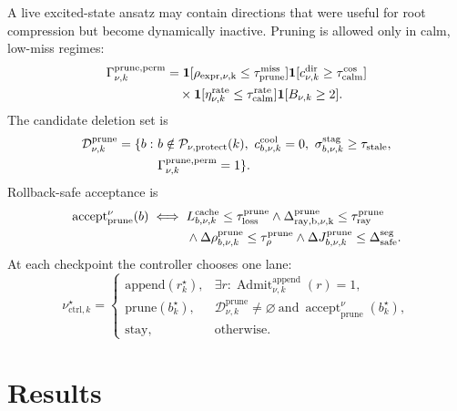 \documentclass[
  reprint,
  amsmath,
  amssymb,
  aps,
  pra,
  nofootinbib,
  superscriptaddress,
  floatfix
]{revtex4-2}
\newcommand{\Dcal}{\mathcal{D}}
\newcommand{\Pcal}{\mathcal{P}}
\newcommand{\ctrl}{\mathrm{ctrl}}
\newcommand{\stay}{\mathrm{stay}}
\newcommand{\app}{\mathrm{append}}
\newcommand{\prune}{\mathrm{prune}}
\begin{document}
A live excited-state ansatz may contain directions that were useful for root compression but become dynamically inactive.  Pruning is allowed only in calm, low-miss regimes:
\begin{equation}
\begin{aligned}
\Gamma_{\nu,k}^{\prune,\rm perm}
&=
\mathbf 1[\rho_{\rm expr,\nu,k}\le\tau_{\prune}^{\rm miss}]
\mathbf 1[c_{\nu,k}^{\rm dir}\ge\tau_{\rm calm}^{\cos}]
\nonumber\\
&\quad\times
\mathbf 1[\eta_{\nu,k}^{\rm rate}\le\tau_{\rm calm}^{\rm rate}]
\mathbf 1[B_{\nu,k}\ge2].
\end{aligned}
\label{eq:excited_prune_perm}
\end{equation}
The candidate deletion set is
\begin{equation}
\begin{aligned}
\Dcal_{\nu,k}^{\prune}
=\{b:\ &b\notin\Pcal_{\nu,\rm protect}(k),\
c_{b,\nu,k}^{\rm cool}=0,\
\sigma_{b,\nu,k}^{\rm stag}\ge\tau_{\rm stale},\\
&\Gamma_{\nu,k}^{\prune,\rm perm}=1\}.
\end{aligned}
\label{eq:excited_prune_candidates}
\end{equation}
Rollback-safe acceptance is
\begin{equation}
\begin{aligned}
\operatorname{accept}_{\prune}^{\nu}(b)\iff{}&
L_{b,\nu,k}^{\rm cache}\le\tau_{\rm loss}^{\prune}
\wedge
\Delta_{\rm ray,b,\nu,k}^{\prune}\le\tau_{\rm ray}^{\prune}
\nonumber\\
&\wedge
\Delta\rho_{b,\nu,k}^{\prune}\le\tau_{\rho}^{\prune}
\wedge
\Delta J_{b,\nu,k}^{\prune}\le\Delta_{\rm safe}^{\rm seg}.
\end{aligned}
\label{eq:excited_prune_accept}
\end{equation}
At each checkpoint the controller chooses one lane:
\begin{equation}
\nu_{\ctrl,k}^{\star}=
\begin{cases}
\app(r_k^\star),&\exists r:\operatorname{Admit}_{\nu,k}^{\app}(r)=1,\\
\prune(b_k^\star),&\Dcal_{\nu,k}^{\prune}\neq\varnothing\
\text{and}\ \operatorname{accept}_{\prune}^{\nu}(b_k^\star),\\
\stay,&\text{otherwise.}
\end{cases}
\label{eq:excited_hybrid_lane}
\end{equation}

\section{Results}
\label{sec:results}
\end{document}
